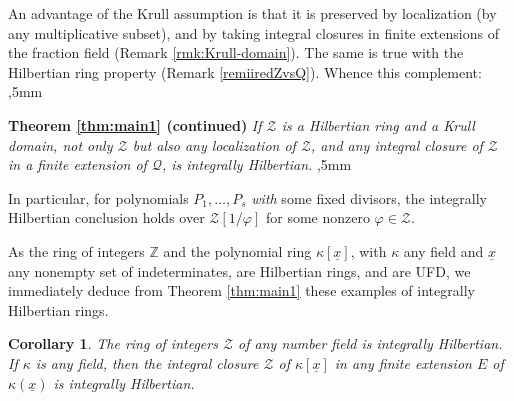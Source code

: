 \documentclass[11pt,a4paper,reqno]{amsart}
\newtheorem{cor}[thm]{Corollary}
\theoremstyle{definition}
\begin{document}
{An advantage of the Krull assumption 
is that it is preserved by localization (by any multiplicative subset), and by taking integral closures in finite extensions of the fraction field (Remark \ref{rmk:Krull-domain}).
The same is true with the Hilbertian ring property (Remark \ref{remiiredZvsQ}). Whence this complement:
,5mm

\noindent
{\bf Theorem \ref{thm:main1} \hbox{\rm (continued)}} \emph{If ${\mathcal Z}$ is a Hilbertian ring and a Krull domain,
not only ${\mathcal Z}$ 
but also 
any localization of ${\mathcal Z}$, and any integral closure of ${\mathcal Z}$ in a finite extension of ${\mathcal Q}$, is integrally Hilbertian.}
,5mm

In particular, 
for polynomials $P_1,\ldots,P_s$ \emph{with} some fixed divisors, the integrally Hilbertian conclusion  holds over  ${\mathcal Z}[1/\varphi]$ for some nonzero $\varphi \in {\mathcal Z}$.  
\vskip 1mm

As the ring of integers ${\mathbb Z}$ and the polynomial ring $\kappa[\underline x]$, with $\kappa$ any field and $\underline x$ any nonempty set of indeterminates, are  Hilbertian rings, and  are UFD, we immediately deduce from Theorem \ref{thm:main1} these examples of integrally Hilbertian rings.

\begin{cor}\label{cor:main1} The ring of integers ${\mathcal Z}$ of any number field is {integrally Hilbertian}. If $\kappa$ is any field, then the integral closure ${\mathcal Z}$ of $\kappa[\underline x]$ in any finite extension $E$ of $\kappa(\underline x)$ is integrally Hilbertian.
\end{cor}

}
\end{document}
